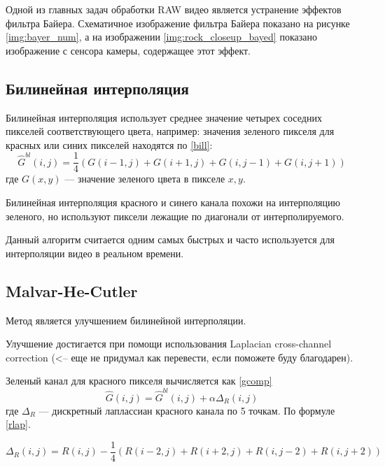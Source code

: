 Одной из главных задач обработки RAW видео является устранение эффектов фильтра Байера. Схематичное изображение фильтра Байера показано на рисунке \ref{img:bayer_num}, а на изображении \ref{img:rock_closeup_bayed} показано изображение с сенсора камеры, содержащее этот эффект.


\newpage 

\subsection{Билинейная интерполяция}
Билинейная интерполяция использует среднее значение четырех соседних пикселей соответствующего цвета, например: значения зеленого пикселя для красных или синих пикселей находятся по \ref{bill}:
\begin{equation}
	\label{bill}
	\hat{G}^{bl}(i,j) = \frac{1}{4}(G(i-1,j) + G(i+1,j) + G(i,j-1) + G(i,j+1))
\end{equation}
где $G(x,y)$ --- значение зеленого цвета в пикселе $x,y$. \cite{mhcd}

Билинейная интерполяция красного и синего канала похожи на интерполяцию зеленого, но используют пиксели лежащие по диагонали от интерполируемого.

Данный алгоритм считается одним самых быстрых и часто используется для интерполяции видео в реальном времени. \cite{bilinear}

\subsection{Malvar-He-Cutler}

Метод является улучшением билинейной интерполяции.

Улучшение достигается при помощи использования Laplacian cross-channel correction (<-- еще не придумал как перевести, если поможете буду благодарен). 

Зеленый канал для красного пикселя вычисляется как \ref{gcomp}
\begin{equation}
	\label{gcomp}
	\hat{G}(i,j) = \hat{G}^{bl}(i,j) + \alpha\Delta_{R}(i,j) 
\end{equation}
где $\Delta_{R}$ --- дискретный лаплассиан красного канала по 5 точкам. По формуле \ref{rlap}.

\begin{equation}
	\label{rlap}
	\Delta_{R}(i,j) = R(i,j) - \frac{1}{4} (R(i-2,j) + R(i+2,j)+R(i,j-2)+R(i,j+2))
\end{equation}

